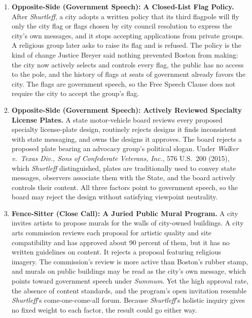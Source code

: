 \documentclass[12pt]{article}
\begin{document}
\begin{enumerate}
\item \textbf{Opposite-Side (Government Speech): A Closed-List Flag Policy.} After \textit{Shurtleff}, a city adopts a written policy that its third flagpole will fly only the city flag or flags chosen by city council resolution to express the city's own messages, and it stops accepting applications from private groups. A religious group later asks to raise its flag and is refused. The policy is the kind of change Justice Breyer said nothing prevented Boston from making: the city now actively selects and controls every flag, the public has no access to the pole, and the history of flags at seats of government already favors the city. The flags are government speech, so the Free Speech Clause does not require the city to accept the group's flag.

\item \textbf{Opposite-Side (Government Speech): Actively Reviewed Specialty License Plates.} A state motor-vehicle board reviews every proposed specialty license-plate design, routinely rejects designs it finds inconsistent with state messaging, and owns the designs it approves. The board rejects a proposed plate bearing an advocacy group's political slogan. Under \textit{Walker v.\ Texas Div., Sons of Confederate Veterans, Inc.}, 576 U.S.\ 200 (2015), which \textit{Shurtleff} distinguished, plates are traditionally used to convey state messages, observers associate them with the State, and the board actively controls their content. All three factors point to government speech, so the board may reject the design without satisfying viewpoint neutrality.

\item \textbf{Fence-Sitter (Close Call): A Juried Public Mural Program.} A city invites artists to propose murals for the walls of city-owned buildings. A city arts commission reviews each proposal for artistic quality and site compatibility and has approved about 90 percent of them, but it has no written guidelines on content. It rejects a proposal featuring religious imagery. The commission's review is more active than Boston's rubber stamp, and murals on public buildings may be read as the city's own message, which points toward government speech under \textit{Summum}. Yet the high approval rate, the absence of content standards, and the program's open invitation resemble \textit{Shurtleff}'s come-one-come-all forum. Because \textit{Shurtleff}'s holistic inquiry gives no fixed weight to each factor, the result could go either way.

\end{enumerate}
\end{document}
